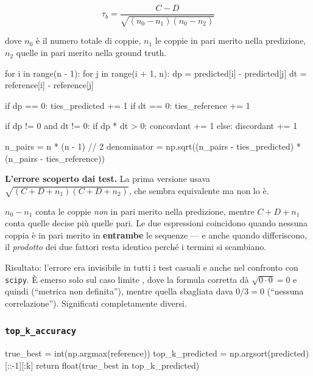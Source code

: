\[
\tau_b = \frac{C - D}{\sqrt{(n_0 - n_1)(n_0 - n_2)}}
\]

dove $n_0$ è il numero totale di coppie, $n_1$ le coppie in pari merito nella predizione, $n_2$
quelle in pari merito nella ground truth.

\begin{idebox}
\begin{pycode}
for i in range(n - 1):
    for j in range(i + 1, n):
        dp = predicted[i] - predicted[j]
        dt = reference[i] - reference[j]

        if dp == 0:
            ties_predicted += 1
        if dt == 0:
            ties_reference += 1

        if dp != 0 and dt != 0:
            if dp * dt > 0:
                concordant += 1
            else:
                discordant += 1

n_pairs = n * (n - 1) // 2
denominator = np.sqrt((n_pairs - ties_predicted) * (n_pairs - ties_reference))
\end{pycode}
\end{idebox}

\begin{attenzione}
\textbf{L'errore scoperto dai test.} La prima versione usava
$\sqrt{(C + D + n_1)(C + D + n_2)}$, che sembra equivalente ma non lo è.

\medskip
$n_0 - n_1$ conta le coppie \emph{non} in pari merito nella predizione, mentre $C + D + n_1$
conta quelle decise più quelle pari. Le due espressioni coincidono quando nessuna coppia è in
pari merito in \textbf{entrambe} le sequenze --- e anche quando differiscono, il \emph{prodotto}
dei due fattori resta identico perché i termini si scambiano.

\medskip
Risultato: l'errore era invisibile in tutti i test casuali e anche nel confronto con
\texttt{scipy}. È emerso solo sul caso limite , dove la
formula corretta dà $\sqrt{0 \cdot 0} = 0$ e quindi  (``metrica non definita''), mentre
quella sbagliata dava $0/3 = 0$ (``nessuna correlazione''). Significati completamente diversi.
\end{attenzione}

\subsubsection{\texttt{top\_k\_accuracy}}

\begin{idebox}
\begin{pycode}
true_best = int(np.argmax(reference))
top_k_predicted = np.argsort(predicted)[::-1][:k]
return float(true_best in top_k_predicted)
\end{pycode}
\end{idebox}

